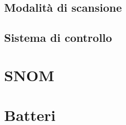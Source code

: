 \documentclass[../main.tex]{subfiles}
\begin{document}
\subsection{Modalità di scansione}

\subsection{Sistema di controllo}



\section{SNOM}

\section{Batteri}
\end{document}
